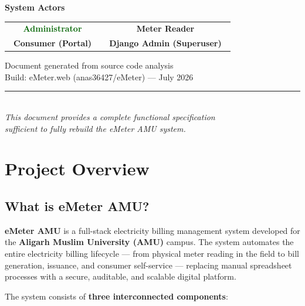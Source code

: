 \documentclass[12pt, a4paper]{report}
\begin{document}
\begin{titlepage}
    {\large\bfseries\color{deepBlue} System Actors}\\[0.6cm]
    \begin{tabular}{cc}
        \colorbox{primaryGreen!15}{\textcolor{darkGreen}{\textbf{\ Administrator\ }}}
        &
        \colorbox{deepBlue!10}{\textcolor{deepBlue}{\textbf{\ Meter Reader\ }}}\\[0.4cm]
        \colorbox{accentAmber!20}{\textcolor{accentAmber!80!black}{\textbf{\ Consumer (Portal)\ }}}
        &
        \colorbox{borderColor}{\textcolor{textMid}{\textbf{\ Django Admin (Superuser)\ }}}
    \end{tabular}
    
    \vfill
    
    {\small\color{textMid}
        Document generated from source code analysis\\
        Build: eMeter.web (anas36427/eMeter) — July 2026\\[0.3cm]
        \textcolor{borderColor}{\rule{6cm}{0.4pt}}\\[0.3cm]
        \textit{This document provides a complete functional specification\\
        sufficient to fully rebuild the eMeter AMU system.}
    }
\end{titlepage}

\tableofcontents
\listoftables

\newpage

\chapter{Project Overview}

\section{What is eMeter AMU?}

\textbf{eMeter AMU} is a full-stack electricity billing management system developed for the \textbf{Aligarh Muslim University (AMU)} campus. The system automates the entire electricity billing lifecycle — from physical meter reading in the field to bill generation, issuance, and consumer self-service — replacing manual spreadsheet processes with a secure, auditable, and scalable digital platform.

\vspace{0.5em}
The system consists of \textbf{three interconnected components}:
\end{document}
